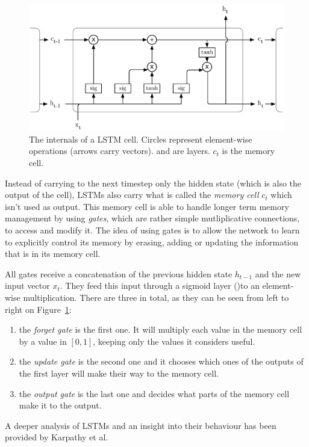 \begin{figure}
	\centering
	\includegraphics[width=0.8\linewidth]{fig/lstm.eps}
	\caption{The internals of a LSTM cell. Circles represent element-wise
	operations (arrows carry vectors).  and 
	 are layers. $c_t$ is the memory cell.}
	\label{fig:lstm}
\end{figure}

Instead of carrying to the next timestep only the hidden state (which is also
the output of the cell), LSTMs also carry what is called the
\textit{memory cell} $c_t$ which isn't used as output. This memory cell is 
able to handle longer term memory management by using \textit{gates}, which
are rather simple mutliplicative connections, to 
access and modify it. The idea of using gates is to allow the network
to learn to explicitly control its memory by erasing, adding or updating the
information that is in its memory cell.

All gates receive a concatenation of the previous hidden
state $h_{t-1}$ and the new input vector $x_t$. They feed this input through a
sigmoid layer ()to an element-wise multiplication. There are 
three in total, as they can be seen from left to right on Figure~\ref{fig:lstm}:
\begin{enumerate}
	\item the \textit{forget gate} is the first one. It will multiply each
		value in the memory cell by a value in $[0, 1]$, keeping only
		the values it considers useful.
	\item the \textit{update gate} is the second one and it chooses which
		ones of the outputs of the first  layer will
		make their way to the memory cell.
	\item the \textit{output gate} is the last one and decides what parts
		of the memory cell make it to the output.
\end{enumerate}
A deeper analysis of LSTMs and an insight into their behaviour has been
provided by Karpathy et al. \cite{lstm-analysis}

